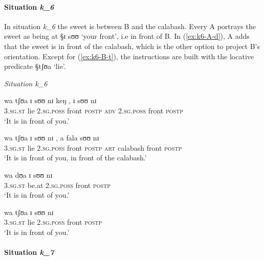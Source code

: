 \paragraph{Situation {\it k_{6}}}
\label{sec:SPA-exper1-loca}

In situation {\it k_{6}} the sweet is between  B and the calabash. Every
A portrays the sweet as being  at  {\S ɪ sʊʊ} `your front', i.e
in front  of  B. In (\ref{ex:k6-A-d}),   A adds that the
sweet is in front of the calabash, which is the other option to project
B's
orientation. Except for (\ref{ex:k6-B-t}), the instructions are built with the
locative  predicate {\S tʃʊa} `lie'.

 


\begin{exe}
\ex\label{ex:k6}\textit{Situation {\it k_{6}}}\\
 \begin{xlist}
  \ex\label{ex:k6-A-w}
\gll wa tʃʊa ɪ sʊʊ  nɪ keŋ , ɪ sʊʊ nɪ\\
\textsc{3.sg.st} lie \textsc{2.sg.poss} front \textsc{postp} \textsc{adv} {} 
\textsc{2.sg.poss} front \textsc{postp}\\

\glt `It is in front of you.'

\ex\label{ex:k6-A-d}
\gll wa tʃʊa ɪ sʊʊ  nɪ , a fala sʊʊ  nɪ \\
\textsc{3.sg.st} lie  \textsc{2.sg.poss} front \textsc{postp}   {} \textsc{art}
calabash front \textsc{postp}\\ 

\glt `It is in front of you, in front of the calabash.'


\ex\label{ex:k6-B-t}
\gll wa dʊa ɪ sʊʊ nɪ \\
\textsc{3.sg.st}  be.at  \textsc{2.sg.poss} front \textsc{postp} \\

\glt `It is in front of you.'

\ex\label{ex:k6-B-m}
\gll wa tʃʊa ɪ sʊʊ  nɪ\\
\textsc{3.sg.st} lie \textsc{2.sg.poss} front \textsc{postp} \\

\glt `It is in front of you.'


 \end{xlist}

\end{exe}



\paragraph{Situation {\it k_{7}}}
\label{sec:SPA-exper1-loca}

